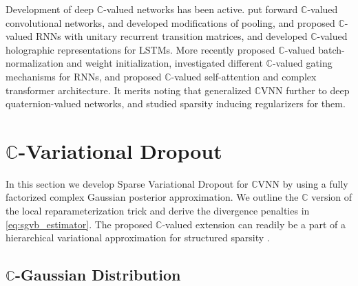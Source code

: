 \documentclass[a4paper,10pt,twocolumn]{article}
\newcommand{\cplx}{\mathbb{C}}
\newcommand{\important}[1]{\textbf{\!\colorbox{red}{#1}\!}}
\newcommand{\todo}[1]{{\color{blue} [TODO]} \important{#1}}
\begin{document}
Development of deep $\cplx$-valued networks has been active. \citet{haensch_complex-valued_2010}
put forward $\cplx$-valued convolutional networks, \citet{guberman_complex_2016} and
\citet{popa_complex-valued_2017} developed modifications of pooling, \citet{arjovsky_unitary_2016}
and \citet{wisdom_full-capacity_2016} proposed $\cplx$-valued RNNs with unitary recurrent
transition matrices, and \citet{danihelka_associative_2016} developed $\cplx$-valued
holographic representations for LSTMs. More recently \citet{trabelsi_deep_2018} proposed
$\cplx$-valued batch-normalization and weight initialization, \citet{wolter_complex_2018}
investigated different $\cplx$-valued gating mechanisms for RNNs, and \citet{yang_complex_2020}
proposed $\cplx$-valued self-attention and complex transformer architecture. It merits
noting that \citet{gaudet_deep_2018} generalized $\cplx$VNN further to deep quaternion-valued
networks, and \citet{vecchi_compressing_2020} studied sparsity inducing regularizers for
them.





\section{$\cplx$-Variational Dropout} %
\label{sec:c_variational_dropout}

In this section we develop Sparse Variational Dropout for $\cplx$VNN by using a fully
factorized complex Gaussian posterior approximation. We outline the $\cplx$ version of
the local reparameterization trick and derive the divergence penalties in \eqref{eq:sgvb_estimator}.
The proposed $\cplx$-valued extension can readily be a part of a hierarchical variational
approximation for structured sparsity \citep{louizos_bayesian_2017}.

\subsection{$\cplx$-Gaussian Distribution} %
\label{sub:c_gauss_and_local_rep}
\end{document}
